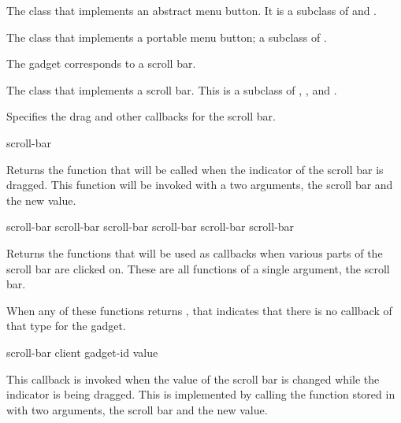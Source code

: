 
The class that implements an abstract menu button.  It is a subclass of
 and .


The class that implements a portable menu button; a subclass of .



The  gadget corresponds to a scroll bar.


The class that implements a scroll bar.  This is a subclass of
, , and .


Specifies the drag and other callbacks for the scroll bar.

 {scroll-bar}

Returns the function that will be called when the indicator of the scroll bar is
dragged.  This function will be invoked with a two arguments, the scroll bar and
the new value.

 {scroll-bar}
 {scroll-bar}
 {scroll-bar}
 {scroll-bar}
 {scroll-bar}
 {scroll-bar}

Returns the functions that will be used as callbacks when various parts of the
scroll bar are clicked on.  These are all functions of a single argument, the
scroll bar.

When any of these functions returns , that indicates that there is no
callback of that type for the gadget.

 {scroll-bar client gadget-id value}

This callback is invoked when the value of the scroll bar is changed while the
indicator is being dragged.  This is implemented by calling the function stored
in  with two arguments, the scroll bar and the new
value.

